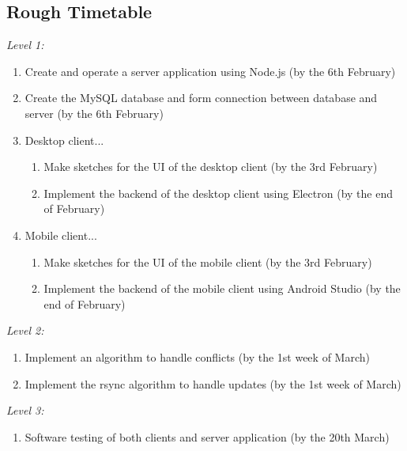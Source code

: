 \documentclass{article}
\begin{document}
	\subsection{Rough Timetable}
	\textit{Level 1:}
	\begin{enumerate}
	\item Create and operate a server application using Node.js (by the 6th February)
	\item Create the MySQL database and form connection between database and server (by the 6th February)
	\item Desktop client...
		\begin{enumerate}
		\item Make sketches for the UI of the desktop client (by the 3rd February)
		\item Implement the backend of the desktop client using Electron (by the end of February)
		\end{enumerate}
	\item Mobile client...
		\begin{enumerate}
		\item  Make sketches for the UI of the mobile client (by the 3rd February)
		\item  Implement the backend of the mobile client using Android Studio (by the end of February)
		\end{enumerate}
	\end{enumerate}
	\textit{Level 2:}
	\begin{enumerate}
	\item Implement an algorithm to handle conflicts (by the 1st week of March)
	\item Implement the rsync algorithm to handle updates (by the 1st week of March)
	\end{enumerate}
	\textit{Level 3:}
	\begin{enumerate}
	\item Software testing of both clients and server application (by the 20th March)
	\end{enumerate}
\end{document}
